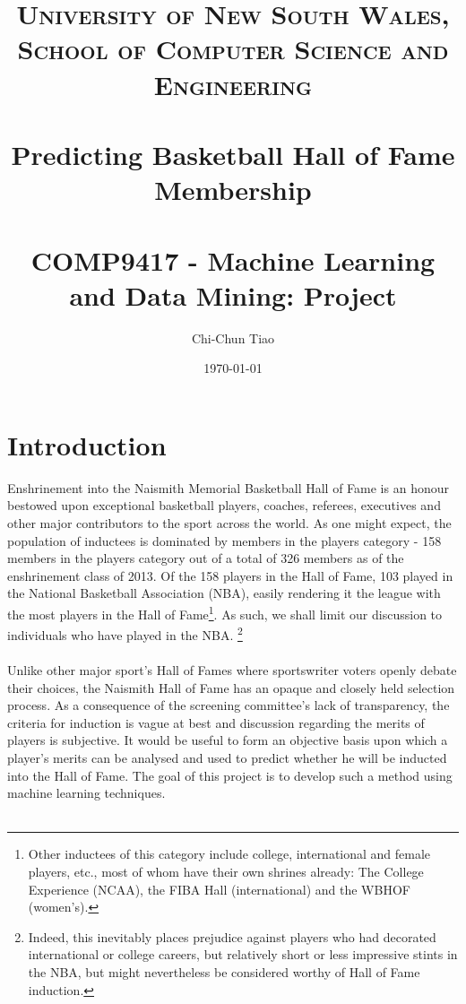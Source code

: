 \documentclass[paper=a4, fontsize=11pt]{scrartcl} %
\title{	
\normalfont \normalsize 
\textsc{University of New South Wales, School of Computer Science and Engineering} \\ [25pt] %
\horrule{0.5pt} \\[0.4cm] %
\huge Predicting Basketball Hall of Fame Membership\\ %
\horrule{2pt} \\[0.5cm] %
\large COMP9417 - Machine Learning and Data Mining: Project
}
\author{Chi-Chun Tiao} %
\date{\normalsize\today} %
\numberwithin{equation}{section} %
\numberwithin{figure}{section} %
\numberwithin{table}{section} %
\begin{document}
\maketitle %


\section{Introduction}

Enshrinement into the Naismith Memorial Basketball Hall of Fame is an honour bestowed upon exceptional basketball players, coaches, referees, executives and other major contributors to the sport across the world. As one might expect, the population of inductees is dominated by members in the players category - 158 members in the players category out of a total of 326 members as of the enshrinement class of 2013\cite{hof_member_idx}. Of the 158 players in the Hall of Fame, 103 played in the National Basketball Association (NBA), easily rendering it the league with the most players in the Hall of Fame\footnote{Other inductees of this category include college, international and female players, etc., most of whom have their own shrines already: The College Experience (NCAA), the FIBA Hall (international) and the WBHOF (women's).}. As such, we shall limit our discussion to individuals who have played in the NBA. \footnote{Indeed, this inevitably places prejudice against players who had decorated international or college careers, but relatively short or less impressive stints in the NBA, but might nevertheless be considered worthy of Hall of Fame induction.}\\
\\
Unlike other major sport's Hall of Fames where sportswriter voters openly debate their choices, the Naismith Hall of Fame has an opaque and closely held selection process\cite{aschburner}. As a consequence of the screening committee's lack of transparency, the criteria for induction is vague at best and discussion regarding the merits of players is subjective. It would be useful to form an objective basis upon which a player's merits can be analysed and used to predict whether he will be inducted into the Hall of Fame. The goal of this project is to develop such a method using machine learning techniques.\\
\\
\end{document}
